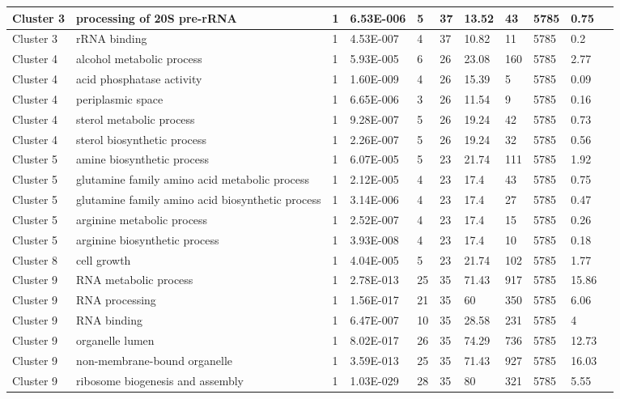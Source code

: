 \begin{tabular}{|l|l|l|l|l|l|l|l|l|l|l|}
\hline
Cluster 3&processing of 20S pre-rRNA&1&6.53E-006&5&37&13.52&43&5785&0.75&\\
\hline
Cluster 3&rRNA binding&1&4.53E-007&4&37&10.82&11&5785&0.2&\\
\hline
Cluster 4&alcohol metabolic process&1&5.93E-005&6&26&23.08&160&5785&2.77&\\
\hline
Cluster 4&acid phosphatase activity&1&1.60E-009&4&26&15.39&5&5785&0.09&\\
\hline
Cluster 4&periplasmic space&1&6.65E-006&3&26&11.54&9&5785&0.16&\\
\hline
Cluster 4&sterol metabolic process&1&9.28E-007&5&26&19.24&42&5785&0.73&\\
\hline
Cluster 4&sterol biosynthetic process&1&2.26E-007&5&26&19.24&32&5785&0.56&\\
\hline
Cluster 5&amine biosynthetic process&1&6.07E-005&5&23&21.74&111&5785&1.92&\\
\hline
Cluster 5&glutamine family amino acid metabolic process&1&2.12E-005&4&23&17.4&43&5785&0.75&\\
\hline
Cluster 5&glutamine family amino acid biosynthetic process&1&3.14E-006&4&23&17.4&27&5785&0.47&\\
\hline
Cluster 5&arginine metabolic process&1&2.52E-007&4&23&17.4&15&5785&0.26&\\
\hline
Cluster 5&arginine biosynthetic process&1&3.93E-008&4&23&17.4&10&5785&0.18&\\
\hline
Cluster 8&cell growth&1&4.04E-005&5&23&21.74&102&5785&1.77&\\
\hline
Cluster 9&RNA metabolic process&1&2.78E-013&25&35&71.43&917&5785&15.86&\\
\hline
Cluster 9&RNA processing&1&1.56E-017&21&35&60&350&5785&6.06&\\
\hline
Cluster 9&RNA binding&1&6.47E-007&10&35&28.58&231&5785&4&\\
\hline
Cluster 9&organelle lumen&1&8.02E-017&26&35&74.29&736&5785&12.73&\\
\hline
Cluster 9&non-membrane-bound organelle&1&3.59E-013&25&35&71.43&927&5785&16.03&\\
\hline
Cluster 9&ribosome biogenesis and assembly&1&1.03E-029&28&35&80&321&5785&5.55&\\
\hline
\end{tabular}
